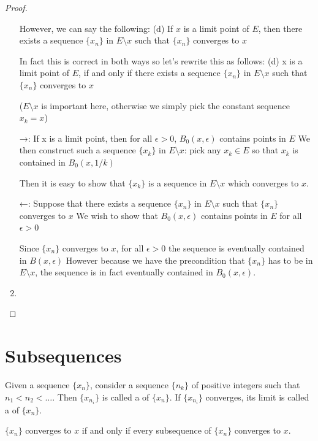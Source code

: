 \begin{proof}
\begin{enumerate}[label=(\arabic*)]
However, we can say the following:
(d) If $x$ is a limit point of $E$, then there exists a sequence $\{x_n\}$ in $E\setminus x$ such that $\{x_n\}$ converges to $x$

In fact this is correct in both ways so let's rewrite this as follows:
(d) x is a limit point of $E$, if and only if there exists a sequence $\{x_n\}$ in $E\setminus x$ such that $\{x_n\}$ converges to $x$

($E\setminus x$ is important here, otherwise we simply pick the constant sequence $x_k=x$)

→: If x is a limit point, then for all $\epsilon>0$, $B_0(x,\epsilon)$ contains points in $E$
We then construct such a sequence $\{x_k\}$ in $E\setminus x$: pick any $x_k \in E$ so that $x_k$ is contained in $B_0(x,1/k)$

Then it is easy to show that $\{x_k\}$ is a sequence in $E\setminus x$ which converges to $x$.

←: Suppose that there exists a sequence $\{x_n\}$ in $E\setminus x$ such that $\{x_n\}$ converges to $x$
We wish to show that $B_0(x,\epsilon)$ contains points in $E$ for all $\epsilon>0$

Since $\{x_n\}$ converges to $x$, for all $\epsilon>0$ the sequence is eventually contained in $B(x,\epsilon)$
However because we have the precondition that $\{x_n\}$ has to be in $E\setminus x$, the sequence is in fact eventually contained in $B_0(x,\epsilon)$.

\item 
\end{enumerate}
\end{proof}


\section{Subsequences}
\begin{definition}
Given a sequence $\{x_n\}$, consider a sequence $\{n_k\}$ of positive integers such that $n_1<n_2<\dots$. Then $\{x_{n_i}\}$ is called a  of $\{x_n\}$. If $\{x_{n_i}\}$ converges, its limit is called a  of $\{x_n\}$.
\end{definition}

\begin{proposition}
$\{x_n\}$ converges to $x$ if and only if every subsequence of $\{x_n\}$ converges to $x$.
\end{proposition}

